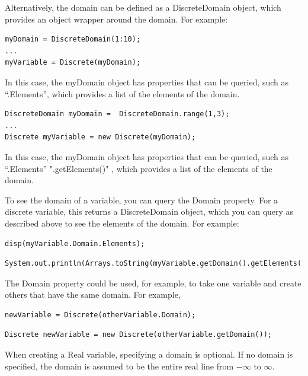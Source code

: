Alternatively, the domain can be defined as a DiscreteDomain object, which provides an object wrapper around the domain.  For example:

\ifmatlab
\begin{lstlisting}
myDomain = DiscreteDomain(1:10);
...
myVariable = Discrete(myDomain);
\end{lstlisting}

In this case, the myDomain object has properties that can be queried, such as ``.Elements'', which provides a list of the elements of the domain.

\fi

\ifjava
\begin{lstlisting}
DiscreteDomain myDomain =  DiscreteDomain.range(1,3);
...
Discrete myVariable = new Discrete(myDomain);
\end{lstlisting}


\fi

In this case, the myDomain object has properties that can be queried, such as \ifmatlab ``.Elements'' \fi \ifjava ".getElements()" \fi, which provides a list of the elements of the domain.

To see the domain of a variable, you can query the Domain property.  For a discrete variable, this returns a DiscreteDomain object, which you can query as described above to see the elements of the domain.  For example:

\ifmatlab
\begin{lstlisting}
disp(myVariable.Domain.Elements);
\end{lstlisting}
\fi

\ifjava
\begin{lstlisting}
System.out.println(Arrays.toString(myVariable.getDomain().getElements()));
\end{lstlisting}
\fi

The Domain property could be used, for example, to take one variable and create others that have the same domain.  For example,

\ifmatlab
\begin{lstlisting}
newVariable = Discrete(otherVariable.Domain);
\end{lstlisting}
\fi

\ifjava
\begin{lstlisting}
Discrete newVariable = new Discrete(otherVariable.getDomain());
\end{lstlisting}
\fi



When creating a Real variable, specifying a domain is optional.  If no domain is specified, the domain is assumed to be the entire real line from $-\infty$ to $\infty$.

